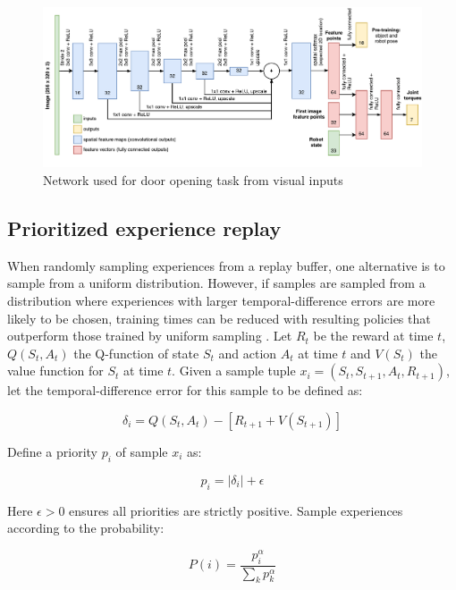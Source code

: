\begin{figure}[h]
    \centering
    \includegraphics[width = 1.0\textwidth]{res/gps-net.pdf}
    \caption{Network used for door opening task from visual inputs \cite{chebotar2016path}}
    \label{fig:gps_net}
\end{figure}

\subsection{Prioritized experience replay}
\label{sec:prio_sampling}

When randomly sampling experiences from a replay buffer, one alternative is to
sample from a uniform distribution. However, if samples are sampled from a
distribution where experiences with larger temporal-difference errors are more
likely to be chosen, training times can be reduced with resulting policies that
outperform those trained by uniform sampling \cite{schaul2015prioritized}. Let
$R_{t}$ be the reward at time $t$, $Q(S_t, A_t)$ the Q-function of state $S_t$
and action $A_t$ at time $t$ and $V(S_t)$ the value function for $S_t$ at time
$t$. Given a sample tuple $x_i = (S_t, S_{t+1}, A_t, R_{t+1})$, let the
temporal-difference error for this sample to be defined as:

\begin{equation}
    \delta_i = Q(S_{t}, A_t) - \left[ R_{t+1} + V(S_{t+1}) \right]
\end{equation}

Define a priority $p_i$ of sample $x_i$ as:

\begin{equation}
    p_i = |\delta_i| + \epsilon
\end{equation}

Here $\epsilon > 0$ ensures all priorities are strictly positive. Sample experiences
according to the probability:

\begin{equation}
    P(i) = \frac{p_i^\alpha}{\sum_k p_k^\alpha}
\end{equation}

